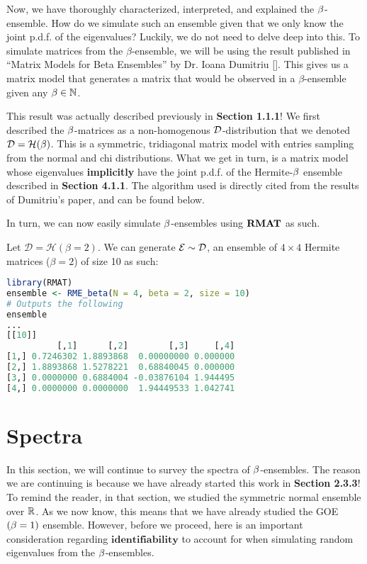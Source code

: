 Now, we have thoroughly characterized, interpreted, and explained the $\beta$-ensemble.
How do we simulate such an ensemble given that we only know the joint p.d.f. of the eigenvalues?
Luckily, we do not need to delve deep into this. To simulate matrices from the $\beta$-ensemble, we will be using the result published in ``Matrix Models for Beta Ensembles'' by Dr. Ioana Dumitriu [\cite{dumitriu}].
This gives us a matrix model that generates a matrix that would be observed in a $\beta$-ensemble given any $\beta \in \mathbb{N}$.


This result was actually described previously in \textbf{Section 1.1.1}! We first described the $\beta$-matrices as a non-homogenous $\mathcal{D}$-distribution that we denoted $\mathcal{D} = \mathcal{H}(\beta)$. This is a symmetric, tridiagonal matrix model with entries sampling from the normal and chi distributions. What we get in turn, is a matrix model whose eigenvalues \textbf{implicitly} have the joint p.d.f. of the Hermite-$\beta$ ensemble described in \textbf{Section 4.1.1}. The algorithm used is directly cited from the results of Dumitriu's paper, and can be found below.

\ALGbeta

In turn, we can now easily simulate $\beta$-ensembles using ${\textbf{RMAT}}$ as such.

\begin{code}[Hermite Beta = 2 Ensemble]
Let $\mathcal{D} = \mathcal{H}(\beta = 2)$. We can generate $\mathcal{E} \sim \mathcal{D}$, an ensemble of $4 \times 4$ Hermite matrices ($\beta = 2$) of size 10 as such:
\end{code}

\begin{lstlisting}[language=R]
library(RMAT)
ensemble <- RME_beta(N = 4, beta = 2, size = 10)
# Outputs the following
ensemble
...
[[10]]
          [,1]      [,2]        [,3]     [,4]
[1,] 0.7246302 1.8893868  0.00000000 0.000000
[2,] 1.8893868 1.5278221  0.68840045 0.000000
[3,] 0.0000000 0.6884004 -0.03876104 1.944495
[4,] 0.0000000 0.0000000  1.94449533 1.042741
\end{lstlisting}

\newpage
\section{Spectra}

In this section, we will continue to survey the spectra of $\beta$-ensembles. The reason we are continuing is because we have already started this work in \textbf{Section 2.3.3}!
To remind the reader, in that section, we studied the symmetric normal ensemble over $\mathbb{R}$. As we now know, this means that we have already studied the GOE $(\beta = 1)$ ensemble.
However, before we proceed, here is an important consideration regarding $\textbf{identifiability}$ to account for when simulating random eigenvalues from the $\beta$-ensembles.

